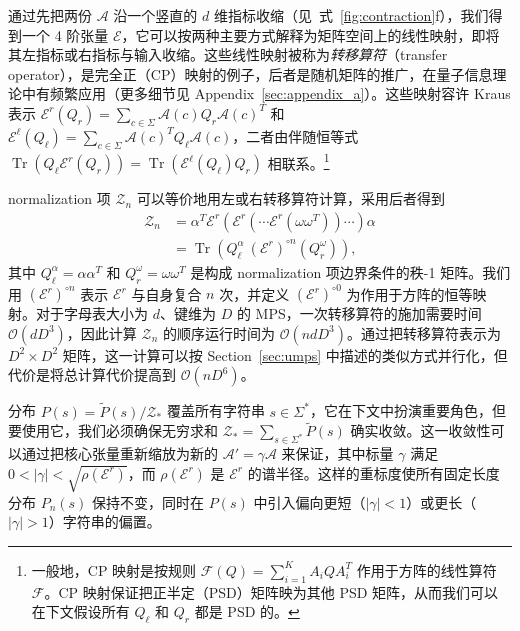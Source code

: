 \documentclass[twoside]{article}
\newcommand{\eqnref}[1]{式~\ref{#1}}
\DeclareMathOperator{\Tr}{Tr}
\newcommand{\bigO}{\mc{O}}
\newcommand{\Z}{\mc{Z}}
\newcommand{\E}{\mc{E}}
\newcommand{\EL}{\mc{E}^{\scriptstyle \ell}}
\newcommand{\ER}{\mc{E}^{\scriptstyle r}}
\newcommand{\QL}{Q_{\ell}}
\newcommand{\QR}{Q_{r}}
\newcommand{\Pt}{\tilde{P}}
\newcommand{\alphamat}{\alpha\alpha^T}
\newcommand{\omegamat}{\omega\omega^T}
\newcommand{\mc}[1]{\mathcal{#1}}
\begin{document}
通过先把两份 $\mc{A}$ 沿一个竖直的 $d$ 维指标收缩（见~\eqnref{fig:contraction}f），我们得到一个 4 阶张量 $\E$，它可以按两种主要方式解释为矩阵空间上的线性映射，即将其左指标或右指标与输入收缩。这些线性映射被称为\emph{转移算符}（transfer operator），是完全正（CP）映射的例子，后者是随机矩阵的推广，在量子信息理论中有频繁应用（更多细节见 Appendix~\ref{sec:appendix_a}）。这些映射容许 Kraus 表示 $\ER(\QR) = \sum_{c\in\Sigma} \mc{A}(c) \QR \mc{A}(c)^T$ 和 $\EL(\QL) = \sum_{c\in\Sigma} \mc{A}(c)^T \QL \mc{A}(c)$，二者由伴随恒等式 $\Tr(\QL \ER(\QR)) = \Tr(\EL(\QL) \QR)$ 相联系。\footnote{一般地，CP 映射是按规则 $\mc{F}(Q) = \sum_{i=1}^K A_i Q A_i^T$ 作用于方阵的线性算符 $\mc{F}$。CP 映射保证把正半定（PSD）矩阵映为其他 PSD 矩阵，从而我们可以在下文假设所有 $\QL$ 和 $\QR$ 都是 PSD 的。}

normalization 项 $\Z_n$ 可以等价地用左或右转移算符计算，采用后者得到
%
\begin{align}
\label{eq:normalization}
\Z_n &= \alpha^T \ER(\ER(\cdots\ER(\omegamat))\cdots) \alpha \nonumber\\
         &= \Tr\left( \QL^\alpha\ (\ER)^{\circ n}(\QR^\omega) \right),
\end{align}
%
其中 $\QL^\alpha = \alphamat$ 和 $\QR^\omega = \omegamat$ 是构成 normalization 项边界条件的秩-1 矩阵。我们用 $(\ER)^{\circ n}$ 表示 $\ER$ 与自身复合 $n$ 次，并定义 $(\ER)^{\circ 0}$ 为作用于方阵的恒等映射。对于字母表大小为 $d$、键维为 $D$ 的 MPS，一次转移算符的施加需要时间 $\bigO(dD^3)$，因此计算 $\Z_n$ 的顺序运行时间为 $\bigO(ndD^3)$。通过把转移算符表示为 $D^2 \times D^2$ 矩阵，这一计算可以按 Section~\ref{sec:umps} 中描述的类似方式并行化，但代价是将总计算代价提高到 $\bigO(nD^6)$。

分布 $P(s) = \Pt(s) / \Z_*$ 覆盖所有字符串 $s\in\Sigma^*$，它在下文中扮演重要角色，但要使用它，我们必须确保无穷求和 $\Z_* = \sum_{s\in\Sigma^*} \Pt(s)$ 确实收敛。这一收敛性可以通过把核心张量重新缩放为新的 $\mc{A}' = \gamma \mc{A}$ 来保证，其中标量 $\gamma$ 满足 $0 < |\gamma| < \sqrt{\rho(\ER)}$，而 $\rho(\ER)$ 是 $\ER$ 的谱半径。这样的重标度使所有固定长度分布 $P_n(s)$ 保持不变，同时在 $P(s)$ 中引入偏向更短（$|\gamma| < 1$）或更长（$|\gamma| > 1$）字符串的偏置。
\end{document}
